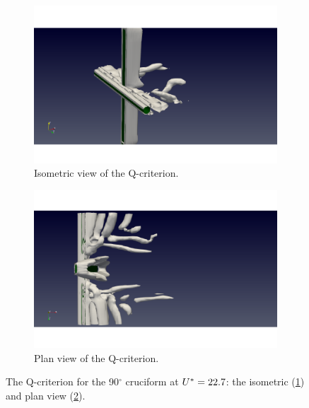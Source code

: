 \documentclass[oneside]{utmthesis}
\begin{document}
\begin{figure}[H]
  \centering
  \begin{subfigure}[h]{0.48\textwidth}
    \includegraphics[width=\textwidth,trim={1.5cm 0 3cm 0},clip]{figs/qIso090U10}
    \caption{Isometric view of the Q-criterion.}
    \label{fig:qIso090U10}
  \end{subfigure}
  \hfill
  \begin{subfigure}[h]{0.48\textwidth}
    \includegraphics[width=\textwidth,trim={1.5cm 0 3cm 0},clip]{figs/qTop090U10}
    \caption{Plan view of the Q-criterion.}
    \label{fig:qTop090U10}
  \end{subfigure}

  \caption{The Q-criterion for the 90$^{\circ}$ cruciform at $U^{*} = 22.7$: the isometric (\ref{fig:qIso090U10}) and plan view (\ref{fig:qTop090U10}).} \label{fig:qCrit090U10}
\end{figure}
\end{document}
